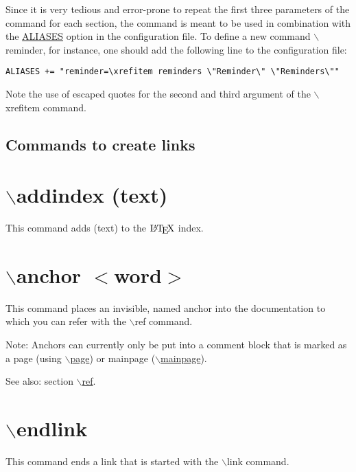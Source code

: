 Since it is very tedious and error-prone to repeat the first three parameters of the command for each section, the command is meant to be used in combination with the \hyperlink{config_cfg_aliases}{ALIASES} option in the configuration file. To define a new command $\backslash$reminder, for instance, one should add the following line to the configuration file: 

\footnotesize\begin{verbatim}ALIASES += "reminder=\xrefitem reminders \"Reminder\" \"Reminders\"" \end{verbatim}
\normalsize
 Note the use of escaped quotes for the second and third argument of the $\backslash$xrefitem command.



 \subsection*{ Commands to create links }\hypertarget{commands_cmdaddindex}{}\section{$\backslash$addindex (text)}\label{commands_cmdaddindex}
 This command adds (text) to the $\mbox{\LaTeX}$ index.



 \hypertarget{commands_cmdanchor}{}\section{$\backslash$anchor $<$word$>$}\label{commands_cmdanchor}
 This command places an invisible, named anchor into the documentation to which you can refer with the $\backslash$ref command.

\begin{Desc}
\item[Note:]Anchors can currently only be put into a comment block that is marked as a page (using \hyperlink{commands_cmdpage}{$\backslash$page}) or mainpage (\hyperlink{commands_cmdmainpage}{$\backslash$mainpage}).\end{Desc}
\begin{Desc}
\item[See also:]section \hyperlink{commands_cmdref}{$\backslash$ref}.\end{Desc}


 \hypertarget{commands_cmdendlink}{}\section{$\backslash$endlink}\label{commands_cmdendlink}
 This command ends a link that is started with the $\backslash$link command.

